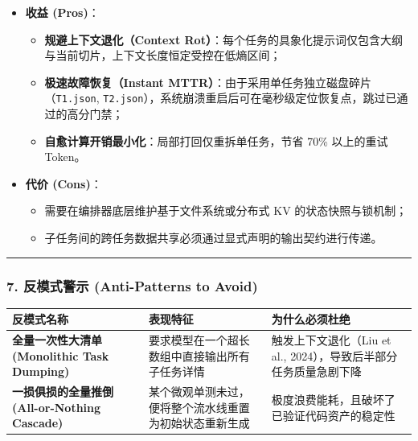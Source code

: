 \begin{itemize}
\tightlist
\item
  \textbf{收益 (Pros)}：

  \begin{itemize}
  \tightlist
  \item
    \textbf{规避上下文退化（Context
    Rot）}：每个任务的具象化提示词仅包含大纲与当前切片，上下文长度恒定受控在低熵区间；
  \item
    \textbf{极速故障恢复（Instant
    MTTR）}：由于采用单任务独立磁盘碎片（\texttt{T1.json},
    \texttt{T2.json}），系统崩溃重启后可在毫秒级定位恢复点，跳过已通过的高分门禁；
  \item
    \textbf{自愈计算开销最小化}：局部打回仅重拆单任务，节省 70\%
    以上的重试 Token。
  \end{itemize}
\item
  \textbf{代价 (Cons)}：

  \begin{itemize}
  \tightlist
  \item
    需要在编排器底层维护基于文件系统或分布式 KV 的状态快照与锁机制；
  \item
    子任务间的跨任务数据共享必须通过显式声明的输出契约进行传递。
  \end{itemize}
\end{itemize}

\begin{center}\rule{0.5\linewidth}{0.5pt}\end{center}

\subsubsection{7. 反模式警示 (Anti-Patterns to
Avoid)}\label{ux53cdux6a21ux5f0fux8b66ux793a-anti-patterns-to-avoid-5}

{\def\LTcaptype{} %
\begin{longtable}[]{@{}
  >{\raggedright\arraybackslash}p{}
  >{\raggedright\arraybackslash}p{}
  >{\raggedright\arraybackslash}p{}@{}}
\toprule\noalign{}
\begin{minipage}[b]{\linewidth}\raggedright
反模式名称
\end{minipage} & \begin{minipage}[b]{\linewidth}\raggedright
表现特征
\end{minipage} & \begin{minipage}[b]{\linewidth}\raggedright
为什么必须杜绝
\end{minipage} \\
\midrule\noalign{}
\endhead
\bottomrule\noalign{}
\endlastfoot
\textbf{全量一次性大清单 (Monolithic Task Dumping)} &
要求模型在一个超长数组中直接输出所有子任务详情 & 触发上下文退化（Liu et
al., 2024），导致后半部分任务质量急剧下降 \\
\textbf{一损俱损的全量推倒 (All-or-Nothing Cascade)} &
某个微观单测未过，便将整个流水线重置为初始状态重新生成 &
极度浪费能耗，且破坏了已验证代码资产的稳定性 \\
\end{longtable}
}

